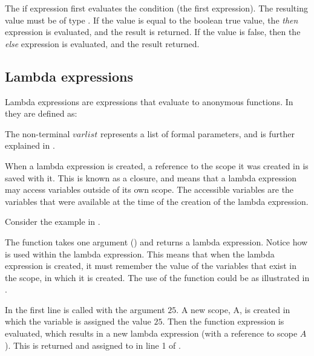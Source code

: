 The if expression first evaluates the condition (the first expression). The
resulting value must be of type . If the value is equal to the
boolean true value, the \emph{then} expression is evaluated, and the result is
returned. If the value is false, then the \emph{else} expression is evaluated,
and the result returned.

\subsection{Lambda expressions}
\label{sec:lambdaexpressions}

Lambda expressions are expressions that evaluate to anonymous functions. In
\productname{} they are defined as:

\begin{ebnf}
\end{ebnf}

The non-terminal $varlist$ represents a list of formal parameters, and is further
explained in .

When a lambda expression is created, a reference to the scope it was created in
is saved with it. This is known as a closure, and means that a lambda
expression may access variables outside of its own scope. The accessible
variables are the variables that were available at the time of the creation of
the lambda expression.

Consider the example in .


The function  takes one argument () and
returns a lambda expression. Notice how  is used within
the lambda expression. This means that when the lambda expression is created, it
must remember the value of the variables that exist in the scope, in which it is
created. The use of the  function could be as illustrated in
.


In the first line  is called with the argument $25$. A new
scope, A, is created in which the variable  is assigned the value
$25$. Then the function expression is evaluated, which results in a new lambda
expression (with a reference to scope $A$).  This is returned and assigned to
 in line 1 of .

